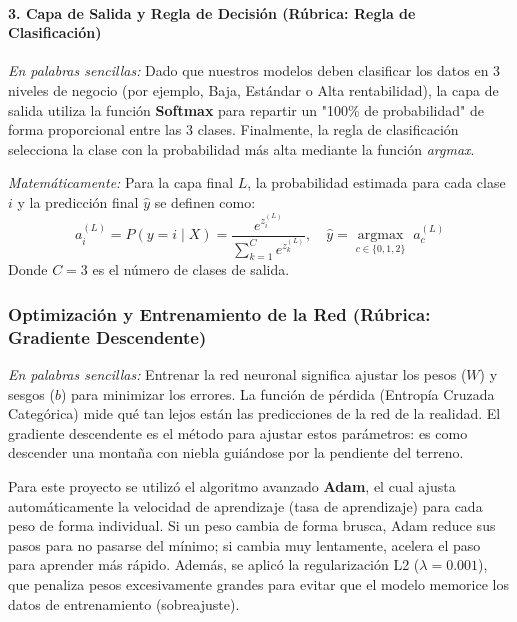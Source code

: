 \documentclass{article}
\begin{document}
\paragraph{3. Capa de Salida y Regla de Decisión (Rúbrica: Regla de Clasificación)}
\textit{En palabras sencillas:} Dado que nuestros modelos deben clasificar los datos en 3 niveles de negocio (por ejemplo, Baja, Estándar o Alta rentabilidad), la capa de salida utiliza la función \textbf{Softmax} para repartir un "100\% de probabilidad" de forma proporcional entre las 3 clases. Finalmente, la regla de clasificación selecciona la clase con la probabilidad más alta mediante la función \textit{argmax}.

\textit{Matemáticamente:} Para la capa final $L$, la probabilidad estimada para cada clase $i$ y la predicción final $\hat{y}$ se definen como:
\begin{equation}
    a_i^{(L)} = P(y = i \mid X) = \frac{e^{z_i^{(L)}}}{\displaystyle\sum_{k=1}^{C} e^{z_k^{(L)}}}, \quad \hat{y} = \operatorname*{argmax}_{c \in \{0, 1, 2\}} \; a_c^{(L)}
\end{equation}
Donde $C = 3$ es el número de clases de salida.

\subsubsection{Optimización y Entrenamiento de la Red (Rúbrica: Gradiente Descendente)}
\textit{En palabras sencillas:} Entrenar la red neuronal significa ajustar los pesos ($W$) y sesgos ($b$) para minimizar los errores. La función de pérdida (Entropía Cruzada Categórica) mide qué tan lejos están las predicciones de la red de la realidad. El gradiente descendente es el método para ajustar estos parámetros: es como descender una montaña con niebla guiándose por la pendiente del terreno.

Para este proyecto se utilizó el algoritmo avanzado \textbf{Adam}, el cual ajusta automáticamente la velocidad de aprendizaje (tasa de aprendizaje) para cada peso de forma individual. Si un peso cambia de forma brusca, Adam reduce sus pasos para no pasarse del mínimo; si cambia muy lentamente, acelera el paso para aprender más rápido. Además, se aplicó la regularización L2 ($\lambda = 0.001$), que penaliza pesos excesivamente grandes para evitar que el modelo memorice los datos de entrenamiento (sobreajuste).
\end{document}
